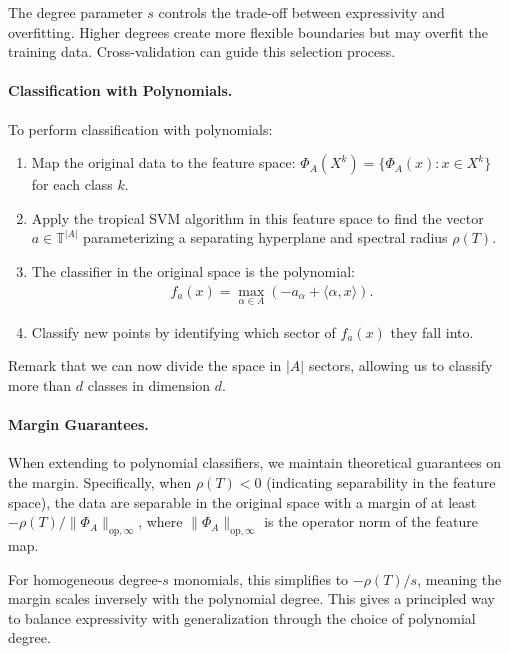 \documentclass{article}
\newcommand{\trop}{\mathbb{T}}
\begin{document}
The degree parameter $s$ controls the trade-off between expressivity and overfitting. Higher degrees create more flexible boundaries but may overfit the training data. Cross-validation can guide this selection process.

\paragraph{Classification with Polynomials.}\label{subsec:poly_classification}
To perform classification with polynomials:

\begin{enumerate}
    \item Map the original data to the feature space: $\Phi_A(X^k) = \{\Phi_A(x) : x \in X^k\}$ for each class $k$.
    
    \item Apply the tropical SVM algorithm in this feature space to find the vector $a \in \trop^{|A|}$ parameterizing a separating hyperplane and spectral radius $\rho(T)$.
    
    \item The classifier in the original space is the polynomial:
    \begin{align}
    f_a(x) = \max_{\alpha \in A} (-a_\alpha + \langle \alpha, x \rangle).
    \end{align}
    
    \item Classify new points by identifying which sector of $f_a(x)$ they fall into.
\end{enumerate}

Remark that we can now divide the space in $|A|$ sectors, allowing us to classify more than $d$ classes in dimension $d$.
\paragraph{Margin Guarantees.}
When extending to polynomial classifiers, we maintain theoretical guarantees on the margin. Specifically, when $\rho(T)<0$ (indicating separability in the feature space), the data are separable in the original space with a margin of at least $-\rho(T)/\lVert \Phi_A\rVert_{\text{op},\infty}$, where $\lVert \Phi_A\rVert_{\text{op},\infty}$ is the operator norm of the feature map.

For homogeneous degree-$s$ monomials, this simplifies to $-\rho(T)/s$, meaning the margin scales inversely with the polynomial degree. This gives a principled way to balance expressivity with generalization through the choice of polynomial degree.
\end{document}
